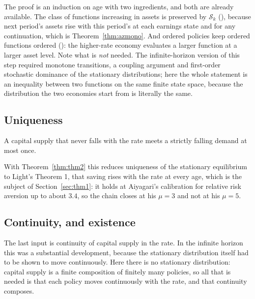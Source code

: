 The proof is an induction on age with two ingredients, and both are already available. The class
of functions increasing in assets is preserved by $\mathcal{S}_k$
(), because next period's assets rise with this period's at each
earnings state and for any continuation, which is Theorem~\ref{thm:azmono}. And ordered policies
keep ordered functions ordered (): the higher-rate economy
evaluates a larger function at a larger asset level. Note what is \emph{not} needed. The
infinite-horizon version of this step required monotone transitions, a coupling argument and
first-order stochastic dominance of the stationary distributions; here the whole statement is an
inequality between two functions on the same finite state space, because the distribution the two
economies start from is literally the same.

\subsection{Uniqueness}

\begin{theorem}\label{thm:thm3}
A capital supply that never falls with the rate meets a strictly falling demand at most once.
\end{theorem}

With Theorem~\ref{thm:thm2} this reduces uniqueness of the stationary equilibrium to Light's
Theorem 1, that saving rises with the rate at every age, which is the subject of
Section~\ref{sec:thm1}: it holds at Aiyagari's calibration for relative risk aversion up to about
$3.4$, so the chain closes at his $\mu=3$ and not at his $\mu=5$.

\subsection{Continuity, and existence}

The last input is continuity of capital supply in the rate. In the infinite horizon this was a
substantial development, because the stationary distribution itself had to be shown to move
continuously. Here there is no stationary distribution: capital supply is a finite composition of
finitely many policies, so all that is needed is that each policy moves continuously with the
rate, and that continuity composes.

